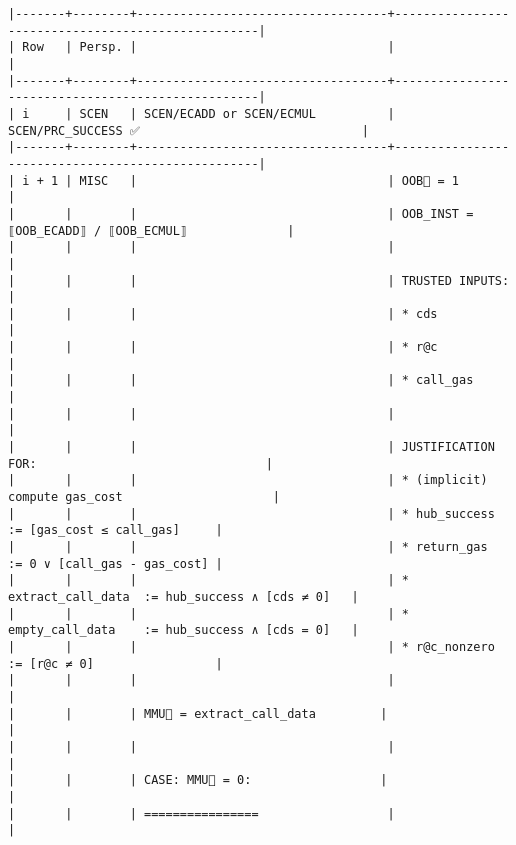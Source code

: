 \documentclass[varwidth=\maxdimen,margin=0.5cm,multi={verbatim}]{standalone}
\begin{document}
\begin{verbatim}
|-------+--------+-----------------------------------+---------------------------------------------------|
| Row   | Persp. |                                   |                                                   |
|-------+--------+-----------------------------------+---------------------------------------------------|
| i     | SCEN   | SCEN/ECADD or SCEN/ECMUL          | SCEN/PRC_SUCCESS ✅                               |
|-------+--------+-----------------------------------+---------------------------------------------------|
| i + 1 | MISC   |                                   | OOB🚩 = 1                                         |
|       |        |                                   | OOB_INST = ⟦OOB_ECADD⟧ / ⟦OOB_ECMUL⟧              |
|       |        |                                   |                                                   |
|       |        |                                   | TRUSTED INPUTS:                                   |
|       |        |                                   | * cds                                             |
|       |        |                                   | * r@c                                             |
|       |        |                                   | * call_gas                                        |
|       |        |                                   |                                                   |
|       |        |                                   | JUSTIFICATION FOR:                                |
|       |        |                                   | * (implicit) compute gas_cost                     |
|       |        |                                   | * hub_success        := [gas_cost ≤ call_gas]     |
|       |        |                                   | * return_gas         := 0 ∨ [call_gas - gas_cost] |
|       |        |                                   | * extract_call_data  := hub_success ∧ [cds ≠ 0]   |
|       |        |                                   | * empty_call_data    := hub_success ∧ [cds = 0]   |
|       |        |                                   | * r@c_nonzero        := [r@c ≠ 0]                 |
|       |        |                                   |                                                   |
|       |        | MMU🚩 = extract_call_data         |                                                   |
|       |        |                                   |                                                   |
|       |        | CASE: MMU🚩 = 0:                  |                                                   |
|       |        | ================                  |                                                   |

\end{verbatim}
\end{document}

